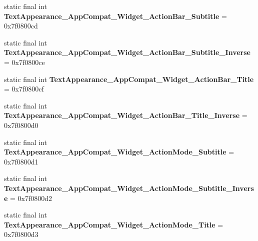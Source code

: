 \begin{DoxyCompactItemize}
\item 
\hypertarget{classandroid_1_1support_1_1v7_1_1appcompat_1_1_r_1_1style_a060fdc4b1fab528d2a11af1ff7af10a8}{}static final int {\bfseries Text\+Appearance\+\_\+\+App\+Compat\+\_\+\+Widget\+\_\+\+Action\+Bar\+\_\+\+Subtitle} = 0x7f0800cd\label{classandroid_1_1support_1_1v7_1_1appcompat_1_1_r_1_1style_a060fdc4b1fab528d2a11af1ff7af10a8}

\item 
\hypertarget{classandroid_1_1support_1_1v7_1_1appcompat_1_1_r_1_1style_ad09887d0863f622563a04c345872e644}{}static final int {\bfseries Text\+Appearance\+\_\+\+App\+Compat\+\_\+\+Widget\+\_\+\+Action\+Bar\+\_\+\+Subtitle\+\_\+\+Inverse} = 0x7f0800ce\label{classandroid_1_1support_1_1v7_1_1appcompat_1_1_r_1_1style_ad09887d0863f622563a04c345872e644}

\item 
\hypertarget{classandroid_1_1support_1_1v7_1_1appcompat_1_1_r_1_1style_a85ad5971aea90f7ccb526eb8740109e5}{}static final int {\bfseries Text\+Appearance\+\_\+\+App\+Compat\+\_\+\+Widget\+\_\+\+Action\+Bar\+\_\+\+Title} = 0x7f0800cf\label{classandroid_1_1support_1_1v7_1_1appcompat_1_1_r_1_1style_a85ad5971aea90f7ccb526eb8740109e5}

\item 
\hypertarget{classandroid_1_1support_1_1v7_1_1appcompat_1_1_r_1_1style_aae56fc22cd4a5422e5bbd3527cdfbca8}{}static final int {\bfseries Text\+Appearance\+\_\+\+App\+Compat\+\_\+\+Widget\+\_\+\+Action\+Bar\+\_\+\+Title\+\_\+\+Inverse} = 0x7f0800d0\label{classandroid_1_1support_1_1v7_1_1appcompat_1_1_r_1_1style_aae56fc22cd4a5422e5bbd3527cdfbca8}

\item 
\hypertarget{classandroid_1_1support_1_1v7_1_1appcompat_1_1_r_1_1style_ae80b6fd99f5c558c8631bf51e84be10f}{}static final int {\bfseries Text\+Appearance\+\_\+\+App\+Compat\+\_\+\+Widget\+\_\+\+Action\+Mode\+\_\+\+Subtitle} = 0x7f0800d1\label{classandroid_1_1support_1_1v7_1_1appcompat_1_1_r_1_1style_ae80b6fd99f5c558c8631bf51e84be10f}

\item 
\hypertarget{classandroid_1_1support_1_1v7_1_1appcompat_1_1_r_1_1style_ace2e9bee4fbb10f73b009e25320c6497}{}static final int {\bfseries Text\+Appearance\+\_\+\+App\+Compat\+\_\+\+Widget\+\_\+\+Action\+Mode\+\_\+\+Subtitle\+\_\+\+Inverse} = 0x7f0800d2\label{classandroid_1_1support_1_1v7_1_1appcompat_1_1_r_1_1style_ace2e9bee4fbb10f73b009e25320c6497}

\item 
\hypertarget{classandroid_1_1support_1_1v7_1_1appcompat_1_1_r_1_1style_a8916bfb355f4339b9c42ba1331eb478d}{}static final int {\bfseries Text\+Appearance\+\_\+\+App\+Compat\+\_\+\+Widget\+\_\+\+Action\+Mode\+\_\+\+Title} = 0x7f0800d3\label{classandroid_1_1support_1_1v7_1_1appcompat_1_1_r_1_1style_a8916bfb355f4339b9c42ba1331eb478d}


\end{DoxyCompactItemize}
